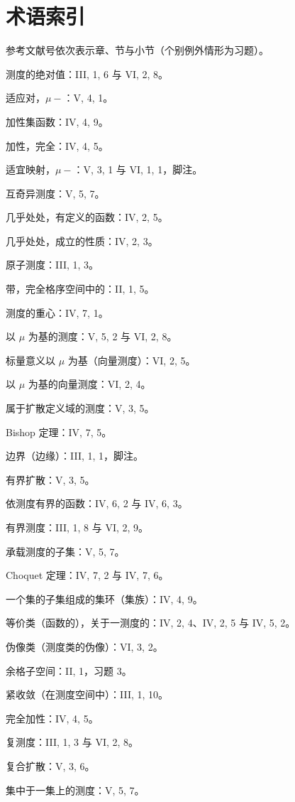 \chapter*{术语索引}
{}

参考文献号依次表示章、节与小节（个别例外情形为习题）。

测度的绝对值：III, 1, 6 与 VI, 2, 8。

适应对，\(\mu-\)：V, 4, 1。

加性集函数：IV, 4, 9。

加性，完全：IV, 4, 5。

适宜映射，\(\mu-\)：V, 3, 1 与 VI, 1, 1，脚注。

互奇异测度：V, 5, 7。

几乎处处，有定义的函数：IV, 2, 5。

几乎处处，成立的性质：IV, 2, 3。

原子测度：III, 1, 3。

带，完全格序空间中的：II, 1, 5。

测度的重心：IV, 7, 1。

以 \(\mu\) 为基的测度：V, 5, 2 与 VI, 2, 8。

标量意义以 \(\mu\) 为基（向量测度）：VI, 2, 5。

以 \(\mu\) 为基的向量测度：VI, 2, 4。

属于扩散定义域的测度：V, 3, 5。

Bishop 定理：IV, 7, 5。

边界（边缘）：III, 1, 1，脚注。

有界扩散：V, 3, 5。

依测度有界的函数：IV, 6, 2 与 IV, 6, 3。

有界测度：III, 1, 8 与 VI, 2, 9。

承载测度的子集：V, 5, 7。

Choquet 定理：IV, 7, 2 与 IV, 7, 6。

一个集的子集组成的集环（集族）：IV, 4, 9。

等价类（函数的），关于一测度的：IV, 2, 4、IV, 2, 5 与 IV, 5, 2。

伪像类（测度类的伪像）：VI, 3, 2。

余格子空间：II, 1，习题 3。

紧收敛（在测度空间中）：III, 1, 10。

完全加性：IV, 4, 5。

复测度：III, 1, 3 与 VI, 2, 8。

复合扩散：V, 3, 6。

集中于一集上的测度：V, 5, 7。

